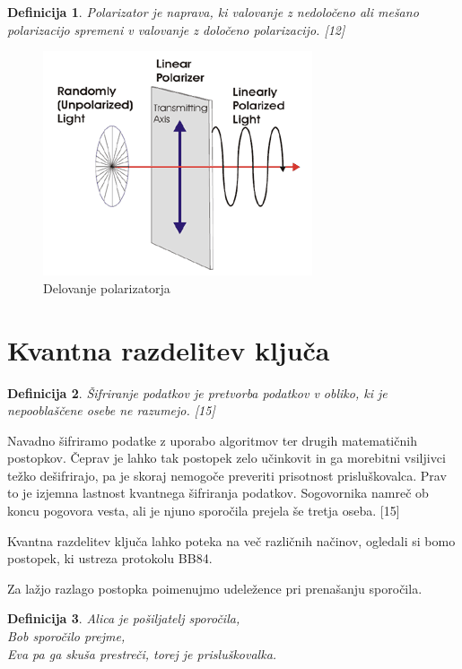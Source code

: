\documentclass[A4paper, 11pt]{article}
\newtheorem{definicija}{Definicija}
\begin{document}
\begin{definicija}
Polarizator je naprava, ki valovanje z nedoločeno ali mešano polarizacijo spremeni v valovanje z določeno polarizacijo. [12]
\end{definicija}

\begin{figure}[h]
\centering
\caption{Delovanje polarizatorja}
\includegraphics[scale=0.6]{linear-figure-1}
\end{figure}

\pagebreak



\section{Kvantna razdelitev ključa}

\begin{definicija}
Šifriranje podatkov je pretvorba podatkov v obliko, ki je nepooblaščene osebe ne razumejo. [15]
\end{definicija}

Navadno šifriramo podatke z uporabo algoritmov ter drugih matematičnih postopkov. Čeprav je lahko tak postopek zelo učinkovit in ga morebitni vsiljivci težko dešifrirajo, pa je skoraj nemogoče preveriti prisotnost prisluškovalca. Prav to je izjemna lastnost kvantnega šifriranja podatkov. Sogovornika namreč ob koncu pogovora vesta, ali je njuno sporočila prejela še tretja oseba. [15]

Kvantna razdelitev ključa lahko poteka na več različnih načinov, ogledali si bomo postopek, ki ustreza protokolu BB84.

Za lažjo razlago postopka poimenujmo udeležence pri prenašanju sporočila.

\begin{definicija}
Alica je pošiljatelj sporočila,\\
Bob sporočilo prejme,\\
Eva pa ga skuša prestreči, torej je prisluškovalka.
\end{definicija}
\end{document}
